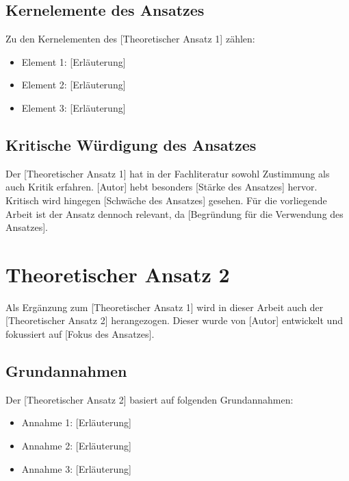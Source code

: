 \subsection{Kernelemente des Ansatzes}
\label{subsec:kernelemente}

Zu den Kernelementen des [Theoretischer Ansatz 1] zählen:

\begin{itemize}
    \item Element 1: [Erläuterung]
    \item Element 2: [Erläuterung]
    \item Element 3: [Erläuterung]
\end{itemize}

\subsection{Kritische Würdigung des Ansatzes}
\label{subsec:kritische_wuerdigung}

Der [Theoretischer Ansatz 1] hat in der Fachliteratur sowohl Zustimmung als auch Kritik erfahren. [Autor] hebt besonders [Stärke des Ansatzes] hervor. Kritisch wird hingegen [Schwäche des Ansatzes] gesehen. Für die vorliegende Arbeit ist der Ansatz dennoch relevant, da [Begründung für die Verwendung des Ansatzes].

\section{Theoretischer Ansatz 2}
\label{sec:theoretischer_ansatz2}

Als Ergänzung zum [Theoretischer Ansatz 1] wird in dieser Arbeit auch der [Theoretischer Ansatz 2] herangezogen. Dieser wurde von [Autor] entwickelt und fokussiert auf [Fokus des Ansatzes].

\subsection{Grundannahmen}
\label{subsec:grundannahmen}

Der [Theoretischer Ansatz 2] basiert auf folgenden Grundannahmen:

\begin{itemize}
    \item Annahme 1: [Erläuterung]
    \item Annahme 2: [Erläuterung]
    \item Annahme 3: [Erläuterung]
\end{itemize}

